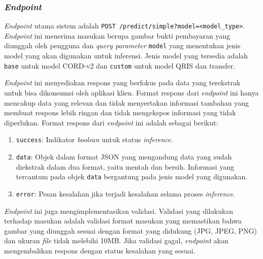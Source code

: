
\subsubsection{\emph{Endpoint}}
\label{subsubsec:endpoint}

\emph{Endpoint} utama sistem adalah \texttt{POST /predict/simple?model=<model\_type>}. \emph{Endpoint} ini menerima masukan berupa gambar bukti pembayaran yang diunggah oleh pengguna dan \emph{query parameter} \texttt{model} yang menentukan jenis model yang akan digunakan untuk inferensi. Jenis model yang tersedia adalah \texttt{base} untuk model \donut{} CORD-v2 dan \texttt{custom} untuk model \donut{} QRIS dan transfer.

\emph{Endpoint} ini menyediakan respons yang berfokus pada data yang terekstrak untuk bisa dikonsumsi oleh aplikasi klien. Format respons dari \emph{endpoint} ini hanya mencakup data yang relevan dan tidak menyertakan informasi tambahan yang membuat respons lebih ringan dan tidak mengekspos informasi yang tidak diperlukan. Format respons dari \emph{endpoint} ini adalah sebagai berikut:
\begin{enumerate}
    \item \texttt{success}: Indikator \emph{boolean} untuk status \emph{inference}.
    \item \texttt{data}: Objek dalam format JSON yang mengandung data yang sudah diekstrak dalam dua format, yaitu mentah dan bersih. Informasi yang tercantum pada objek \texttt{data} bergantung pada jenis model yang digunakan.
    \item \texttt{error}: Pesan kesalahan jika terjadi kesalahan selama proses \emph{inference}.
\end{enumerate}

\emph{Endpoint} ini juga mengimplementasikan validasi. Validasi yang dilakukan terhadap masukan adalah validasi format masukan yang memastikan bahwa gambar yang diunggah sesuai dengan format yang didukung (JPG, JPEG, PNG) dan ukuran \emph{file} tidak melebihi 10MB. Jika validasi gagal, \emph{endpoint} akan mengembalikan respons dengan status kesalahan yang sesuai.

